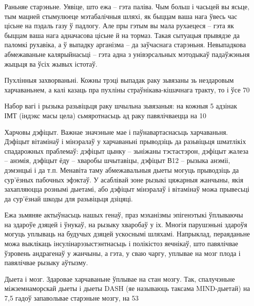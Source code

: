 Раньняе старэньне. Уявіце, што ежа – гэта паліва. Чым больш і часьцей вы ясьце, тым мацней стымулюеце мэтабалічныя шляхі, як быццам ваша нага ўвесь час цісьне на пэдаль газу ў падлогу. Але пры гэтым вы мала рухаецеся – гэта як быццам ваша нага адначасова цісьне й на тормаз. Такая сытуацыя прывядзе да паломкі рухавіка, а ў выпадку арганізма – да заўчаснага старэньня. Невыпадкова абмежаваньне калярыйнасьці – гэта адна з унівэрсальных мэтодыкаў падаўжэньня жыцьця ва ўсіх жывых істотаў.

Пухлінныя захворваньні. Кожны трэці выпадак раку зьвязаны зь нездаровым харчаваньнем, а калі казаць пра пухліны страўнікава-кішачнага тракту, то і ўсе 70%

Набор вагі і рызыка разьвіцьця раку шчыльна зьвязаныя: на кожныя 5 адзінак ІМТ (індэкс масы цела) сьмяротнасьць ад раку павялічваецца на 10%

Харчовы дэфіцыт. Важнае значэньне мае і паўнавартаснасьць харчаваньня. Дэфіцыт вітамінаў і мінэралаў у харчаваньні прыводзіць да разьвіцьця шматлікіх спадарожных праблемаў: дэфіцыт цынку – зьніжаны тэстастэрон, дэфіцыт жалеза – анэмія, дэфіцыт ёду – хваробы шчытавіцы, дэфіцыт В12 – рызыка анэміі, дэмэнцыі і да т.п. Менавіта таму абмежавальныя дыеты могуць прыводзіць да сур'ёзных пабочных эфэктаў. У асаблівай зоне рызыкі цяжарныя жанчыны, якія захапляюцца рознымі дыетамі, або дэфіцыт мінэралаў і вітамінаў можа прывесьці да сур'ёзнай шкоды для разьвіцьця дзіцяці.

Ежа зьмяняе актыўнасьць нашых генаў, праз мэханізмы эпігенэтыкі ўплываючы на здароўе дзяцей і ўнукаў, на рызыку хваробаў у іх. Многія парушэньні здароўя могуць уплываць на будучых дзяцей ускоснымі шляхамі. Напрыклад, пераяданьне можа выклікаць інсулінарэзыстэнтнасьць і полікістоз яечнікаў, што павялічвае ўзровень андрагенаў у жанчыны, а гэта, у сваю чаргу, уплывае на мозг плода і павялічвае рызыку аўтызму.

Дыета і мозг. Здаровае харчаваньне ўплывае на стан мозгу. Так, спалучэньне міжземнаморскай дыеты і дыеты DASH (яе называюць таксама MIND-дыетай) на 7,5 гадоў запавольвае старэньне мозгу, на 53%


